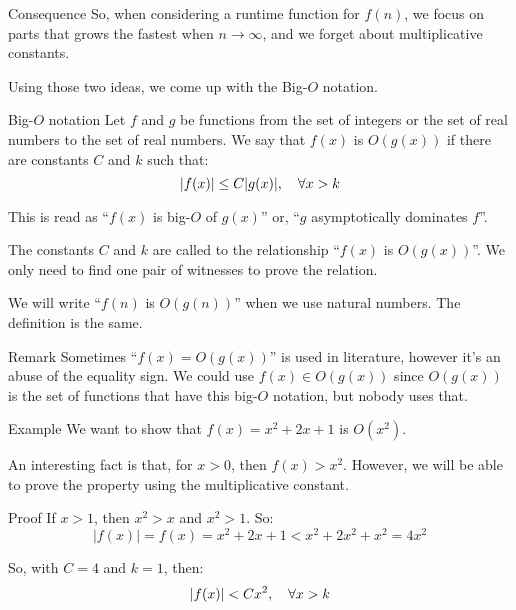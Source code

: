 \documentclass[a4paper]{article}
\begin{document}
\begin{parag}{Consequence}
    So, when considering a runtime function for $f\left(n\right)$, we focus on parts that grows the fastest when $n\to \infty$, and we forget about multiplicative constants.

    Using those two ideas, we come up with the Big-$O$ notation.
\end{parag}

\begin{parag}{Big-$O$ notation}
    Let $f$ and $g$ be functions from the set of integers or the set of real numbers to the set of real numbers. We say that $f\left(x\right)$ is $O\left(g\left(x\right)\right)$ if there are constants $C$ and $k$ such that:
    \[\left|f\left(x\right)\right| \leq C\left|g\left(x\right)\right|, \mathspace \forall x > k\]

    This is read as ``$f\left(x\right)$ is big-$O$ of $g\left(x\right)$'' or, ``$g$ asymptotically dominates $f$''.

    The constants $C$ and $k$ are called  to the relationship ``$f\left(x\right)$ is $O\left(g\left(x\right)\right)$''. We only need to find one pair of witnesses to prove the relation.

    We will write ``$f\left(n\right)$ is $O\left(g\left(n\right)\right)$'' when we use natural numbers. The definition is the same.

    \begin{subparag}{Remark}
        Sometimes ``$f\left(x\right) = O\left(g\left(x\right)\right)$'' is used in literature, however it's an abuse of the equality sign. We could use $f\left(x\right) \in O\left(g\left(x\right)\right)$ since $O\left(g\left(x\right)\right)$ is the set of functions that have this big-$O$ notation, but nobody uses that.
    \end{subparag}
\end{parag}

\begin{parag}{Example}
    We want to show that $f\left(x\right) = x^2 + 2x + 1$ is $O\left(x^2\right)$.

    An interesting fact is that, for $x > 0$, then $f\left(x\right) > x^2$. However, we will be able to prove the property using the multiplicative constant.

    \begin{subparag}{Proof}
        If $x > 1$, then $x^2 > x$ and $x^2 > 1$. So:
        \[\left|f\left(x\right)\right| = f\left(x\right) = x^2 + 2x + 1 < x^2+ 2x^2 + x^2 = 4x^2\]

        So, with $C = 4$ and $k = 1$, then:
        \[\left|f\left(x\right)\right| < Cx^2, \mathspace \forall x > k\]
    \end{subparag}

\end{parag}
\end{document}
